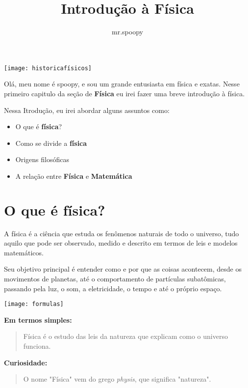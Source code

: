 \documentclass[portuguese,11pt,a4paper,oneside, openany]{article}
\title{Introdução à Física}
\author{mr.spoopy}
\date{}
\begin{document}
	
	\maketitle

	\begin{center}
		\texttt{[image: historicafísicos]}
	\end{center}
	

	Olá, meu nome é spoopy, e sou um grande entusiasta em física e exatas. Nesse primeiro capitulo da seção de \textbf{Física} eu irei fazer uma breve introdução à física.
	
	Nessa Itrodução, eu irei abordar alguns assuntos como:
	\begin{itemize}
		\item O que é \textbf{física}?
		\item Como se divide a \textbf{física}
		\item Origens filosóficas
		\item A relação entre \textbf{Física} e \textbf{Matemática}
	\end{itemize}
	
	
	
	\newpage
	\section{O que é física?}
	A física é a ciência que estuda os fenômenos naturais de todo o universo, tudo aquilo que pode ser observado, medido e descrito em termos de leis e modelos matemáticos.
	
	Seu objetivo principal é entender como e por que as coisas acontecem, desde os movimentos de planetas, até o comportamento de partículas subatômicas, passando pela luz, o som, a eletricidade, o tempo e até o próprio espaço.
	
	\begin{center}
		\texttt{[image: formulas]}
	\end{center}
	
	\textbf{Em termos simples:}
	\begin{quote}
		Física é o estudo das leis da natureza que explicam como o universo funciona.
	\end{quote}
	
	\textbf{Curiosidade:}
	\begin{quote}
		O nome "Física" vem do grego \textit{physis}, que significa "natureza".
	\end{quote}
	
	
	
\end{document}
